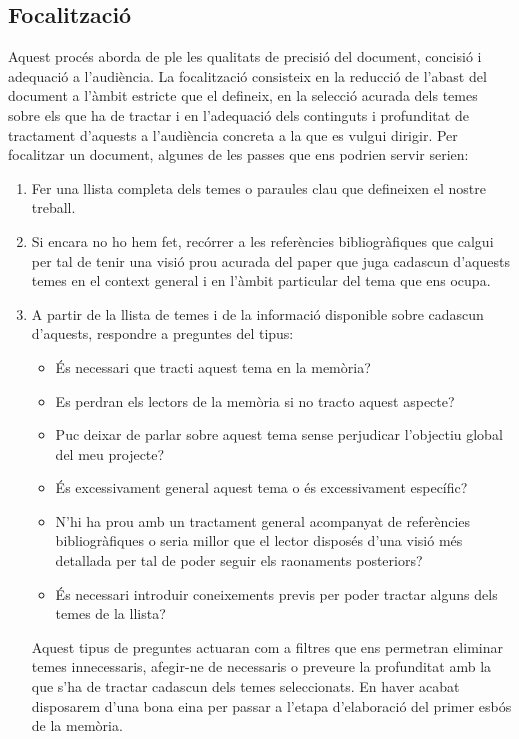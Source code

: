 \subsection{Focalització} Aquest procés aborda de ple les qualitats de precisió del document, concisió i adequació a l'audiència. La focalització consisteix en la reducció de l'abast del document a l'àmbit estricte que el defineix, en la selecció acurada dels temes sobre els que ha de tractar i en l'adequació dels continguts i profunditat de tractament d'aquests a l'audiència concreta a la que es vulgui dirigir. Per focalitzar un document, algunes de les passes que ens podrien servir serien:
\begin{enumerate}
   \item Fer una llista completa dels temes o paraules clau que defineixen el nostre treball.

   \item Si encara no ho hem fet, recórrer a les referències bibliogràfiques que calgui per tal de tenir una visió prou acurada del paper que juga cadascun d'aquests temes en el context general i en l'àmbit particular del tema que ens ocupa.

   \item A partir de la llista de temes i de la informació disponible sobre cadascun d'aquests, respondre a preguntes del tipus:
   \begin{itemize}
          \item És necessari que tracti aquest tema en la memòria?
          \item Es perdran els lectors de la memòria si no tracto aquest aspecte?
          \item Puc deixar de parlar sobre aquest tema sense perjudicar l'objectiu global del meu projecte?
          \item És excessivament general aquest tema o és excessivament específic?
          \item N'hi ha prou amb un tractament general acompanyat de referències bibliogràfiques o seria millor que el lector disposés d'una visió més detallada per tal de poder seguir els raonaments posteriors?
          \item És necessari introduir coneixements previs per poder tractar alguns dels temes de la llista?
   \end{itemize}
   Aquest tipus de preguntes actuaran com a filtres que ens permetran eliminar temes innecessaris, afegir-ne de necessaris o preveure la profunditat amb la que s'ha de tractar cadascun dels temes seleccionats. En haver acabat disposarem d'una bona eina per passar a l'etapa d'elaboració del primer esbós de la memòria.
\end{enumerate}

